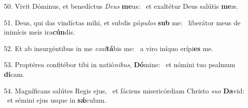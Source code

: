 50. Vivit Dóminus, et benedíctus \textit{De}\textit{us} \textbf{me}us: \ast\  et exaltétur Deus salútis \textbf{me}æ.\

51. Deus, qui das vindíctas mihi, et subdis pó\textit{pu}\textit{los} \textbf{sub} me: \ast\  liberátor meus de inimícis meis ira\textbf{cún}dis.\

52. Et ab insurgéntibus in me \textit{ex}\textit{al}\textbf{tá}bis me: \ast\  a viro iníquo erípi\textbf{es} me.\

53. Proptérea confitébor tibi in natió\textit{ni}\textit{bus}, \textbf{Dó}mine: \ast\  et nómini tuo psalmum \textbf{di}cam.\

54. Magníficans salútes Regis ejus, \dag\  et fáciens misericórdiam Christo \textit{su}\textit{o} \textbf{Da}vid: \ast\  et sémini ejus usque in \textbf{sǽ}culum.\

